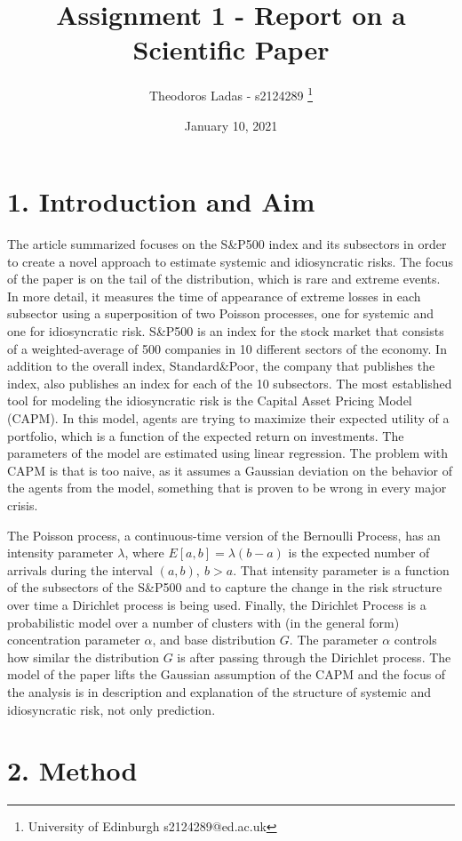 \documentclass[fleqn, a4paper]{report}
\title{Assignment 1 - Report on a Scientific Paper}
\author{
Theodoros Ladas - s2124289 
\footnote{University of Edinburgh s2124289@ed.ac.uk}
}
\date{January 10, 2021}
\begin{document}
\maketitle

\section*{1. Introduction and Aim}
The article summarized  \cite{rodriguez2017assessing} focuses on the S\&P500 index and its subsectors in order to create a novel approach to estimate systemic and idiosyncratic risks. The focus of the paper is on the tail of the distribution, which is rare and extreme events. In more detail, it measures the time of appearance of extreme losses in each subsector using a superposition of two Poisson processes, one for systemic and one for idiosyncratic risk. S\&P500 is an index for the stock market that consists of a weighted-average of 500 companies in 10 different sectors of the economy. In addition to the overall index, Standard\&Poor, the company that publishes the index, also publishes an index for each of the 10 subsectors. The most established tool for modeling the idiosyncratic risk is the Capital Asset Pricing Model (CAPM). In this model, agents are trying to maximize their expected utility of a portfolio, which is a function of the expected return on investments. The parameters of the model are estimated using linear regression. The problem with CAPM is that is too naive, as it assumes a Gaussian deviation on the behavior of the agents from the model, something that is proven to be wrong in every major crisis.

The Poisson process, a continuous-time version of the Bernoulli Process, has an intensity parameter $\lambda$, where $E[a,b] = \lambda(b-a)$ is the expected number of arrivals during the interval $(a,b), ~b>a$. That intensity parameter is a function of the subsectors of the S\&P500 and to capture the change in the risk structure over time a Dirichlet process is being used. Finally, the Dirichlet Process is a probabilistic model over a number of clusters with (in the general form) concentration parameter $\alpha$, and base distribution $G$. The parameter $\alpha$ controls how similar the distribution $G$ is after passing through the Dirichlet process. The model of the paper lifts the Gaussian assumption of the CAPM and the focus of the analysis is in description and explanation of the structure of systemic and idiosyncratic risk, not only prediction.
\section*{2. Method}
\end{document}
